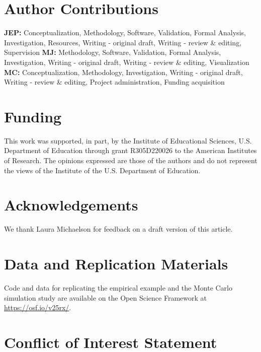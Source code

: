 \documentclass[
  man, donotrepeattitle,floatsintext]{apa7}
\begin{document}
\section*{Author Contributions}\label{author-contributions}

\textbf{JEP:} Conceptualization, Methodology, Software, Validation, Formal Analysis, Investigation, Resources, Writing - original draft, Writing - review \& editing, Supervision \textbf{MJ:} Methodology, Software, Validation, Formal Analysis, Investigation, Writing - original draft, Writing - review \& editing, Visualization \textbf{MC:} Conceptualization, Methodology, Investigation, Writing - original draft, Writing - review \& editing, Project administration, Funding acquisition

\section*{Funding}\label{funding}

This work was supported, in part, by the Institute of Educational Sciences, U.S. Department of Education through grant R305D220026 to the American Institutes of Research.
The opinions expressed are those of the authors and do not represent the views of the Institute of the U.S. Department of Education.

\section*{Acknowledgements}\label{acknowledgements}

We thank Laura Michaelson for feedback on a draft version of this article.

\section*{Data and Replication Materials}\label{data-and-replication-materials}

Code and data for replicating the empirical example and the Monte Carlo simulation study are available on the Open Science Framework at \url{https://osf.io/v25rx/}.

\section*{Conflict of Interest Statement}\label{conflict-of-interest-statement}
\end{document}
